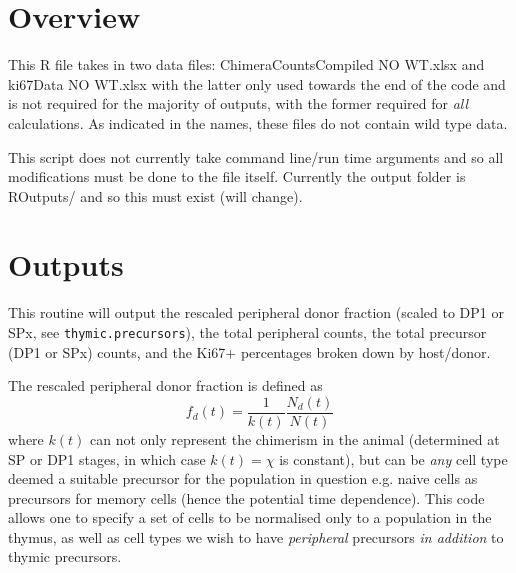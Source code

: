 \documentclass{tufte-book} %
\begin{document}

\section{Overview}

\begin{fullwidth}
This R file takes in two data files: ChimeraCountsCompiled NO WT.xlsx  and ki67Data NO WT.xlsx with the latter only used towards the end of the code and is not required for the majority of outputs, with the former required for \textit{all} calculations. As indicated in the names, these files do not contain wild type data.

This script does not currently take command line/run time arguments and so all modifications must be done to the file itself. Currently the output folder is ROutputs/ and so this must exist (will change).

\end{fullwidth}
\section{Outputs}
This routine will output the rescaled peripheral donor fraction (scaled to DP1 or SPx, see \texttt{thymic.precursors}), the total peripheral counts, the total precursor (DP1 or SPx) counts, and the Ki67+ percentages broken down by host/donor. 

The rescaled peripheral donor fraction is defined as 
\begin{equation}
f_d(t) = \frac{1}{k(t)}\frac{N_d(t)}{N(t)}
\end{equation}
 where $k(t)$ can not only represent the chimerism in the animal (determined at SP or DP1 stages, in which case $k(t)=\chi$ is constant), but can be \textit{any} cell type deemed a suitable precursor for the population in question e.g. naive cells as precursors for memory cells (hence the potential time dependence). This code allows one to specify a set of cells to be normalised only to a population in the thymus, as well as cell types we wish to have \textit{peripheral} precursors \textit{in addition} to thymic precursors.

\end{document}
